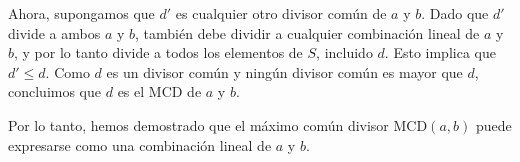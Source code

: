 \documentclass{article}
\begin{document}
Ahora, supongamos que \( d' \) es cualquier otro divisor común de \( a \) y \( b \). Dado que \( d' \) divide a ambos \( a \) y \( b \), también debe dividir a cualquier combinación lineal de \( a \) y \( b \), y por lo tanto divide a todos los elementos de \( S \), incluido \( d \). Esto implica que \( d' \leq d \). Como \( d \) es un divisor común y ningún divisor común es mayor que \( d \), concluimos que \( d \) es el MCD de \( a \) y \( b \).

Por lo tanto, hemos demostrado que el máximo común divisor \( \text{MCD}(a,b) \) puede expresarse como una combinación lineal de \( a \) y \( b \).
\end{document}
